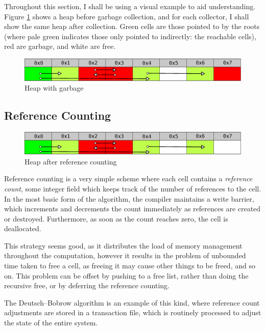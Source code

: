 Throughout this section, I shall be using a visual example to aid
understanding. Figure \ref{fig:lit-gc-before} shows a heap before
garbage collection, and for each collector, I shall show the same heap
after collection. Green cells are those pointed to by the roots (where
pale green indicates those only pointed to indirectly: the reachable
cells), red are garbage, and white are free.

\begin{figure}[h]
  \centering
  \includegraphics[width=\textwidth]{lit-gc-before}
  \caption{Heap with garbage}
  \label{fig:lit-gc-before}
\end{figure}

\subsection{Reference Counting}
\label{sec:lit-gc-refcount}

\begin{figure}[h]
  \centering
  \includegraphics[width=\textwidth]{lit-gc-refcount}
  \caption{Heap after reference counting}
  \label{fig:lit-gc-refcount}
\end{figure}

Reference counting is a very simple scheme where each cell contains a
\textit{reference count}, some integer field which keeps track of the
number of references to the cell. In the most basic form of the
algorithm, the compiler maintains a write barrier, which increments
and decrements the count immediately as references are created or
destroyed. Furthermore, as soon as the count reaches zero, the cell is
deallocated\cite{Collins60}.

This strategy seems good, as it distributes the load of memory
management throughout the computation, however it results in the
problem of unbounded time taken to free a cell, as freeing it may
cause other things to be freed, and so on\cite{GarbageCollection}.
This problem can be offset by pushing to a free list, rather than
doing the recursive free, or by deferring the reference counting.

The Deutsch--Bobrow algorithm is an example of this kind, where
reference count adjustments are stored in a transaction file, which is
routinely processed to adjust the state of the entire
system\cite{Deutsch76}.


